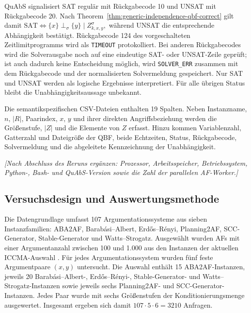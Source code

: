 QuAbS signalisiert SAT regulär mit Rückgabecode 10 und UNSAT mit
Rückgabecode 20. Nach
Theorem~\ref{thm:generic-independence-qbf-correct} gilt damit
\(
    \text{SAT}
    \Longleftrightarrow
    \{x\}\perp_\sigma\{y\}\mid Z_{k,x,y}^{\sigma},
\)
während UNSAT die entsprechende Abhängigkeit bestätigt. Rückgabecode 124
des vorgeschalteten Zeitlimitprogramms wird als \texttt{TIMEOUT}
protokolliert. Bei anderen Rückgabecodes wird die Solverausgabe
noch auf eine eindeutige SAT- oder UNSAT-Zeile geprüft; ist auch dadurch
keine Entscheidung möglich, wird \texttt{SOLVER\_ERR} zusammen mit dem
Rückgabecode und der normalisierten Solvermeldung gespeichert. Nur SAT und
UNSAT werden als logische Ergebnisse interpretiert. Für alle übrigen
Status bleibt die Unabhängigkeitsaussage unbekannt.

Die semantikspezifischen CSV-Dateien enthalten 19 Spalten. Neben
Instanzname, \(n\), \(|R|\), Paarindex, \(x\), \(y\) und ihrer direkten
Angriffsbeziehung werden die Größenstufe, \(|Z|\) und die Elemente von
\(Z\) erfasst. Hinzu kommen Variablenzahl, Gatterzahl und Dateigröße der
QBF, beide Echtzeiten, Status, Rückgabecode, Solvermeldung und die
abgeleitete Kennzeichnung der Unabhängigkeit.

\emph{[Nach Abschluss des Reruns ergänzen: Prozessor,
Arbeitsspeicher, Betriebssystem, Python-, Bash- und QuAbS-Version sowie die
Zahl der parallelen AF-Worker.]}

\iffalse
\subsection{Versuchsdesign und Auswertungsmethode}
\label{subsec:empirical-stable-z-method}

Die Datengrundlage umfasst 107 Argumentationssysteme aus sieben
Instanzfamilien: ABA2AF, Barabási--Albert, Erdős--Rényi, Planning2AF,
SCC-Generator, Stable-Generator und Watts--Strogatz. Ausgewählt wurden AFs mit einer Argumentanzahl 
zwischen 100 und 1.000 aus 
den Instanzen der aktuellen ICCMA-Auswahl \cite{bistarelli:2025:iccma}.
Für jedes Argumentationssystem wurden fünf feste Argumentpaare \((x,y)\) untersucht.
Die Auswahl enthält 15 ABA2AF-Instanzen, jeweils 20
Barabási--Albert-, Erdős--Rényi-, Stable-Generator- und
Watts--Strogatz-Instanzen sowie jeweils sechs Planning2AF- und
SCC-Generator-Instanzen.
Jedes Paar wurde mit sechs Größenstufen der Konditionierungsmenge
ausgewertet. Insgesamt ergeben sich damit
\(107\cdot 5\cdot 6=3210\) Anfragen.

